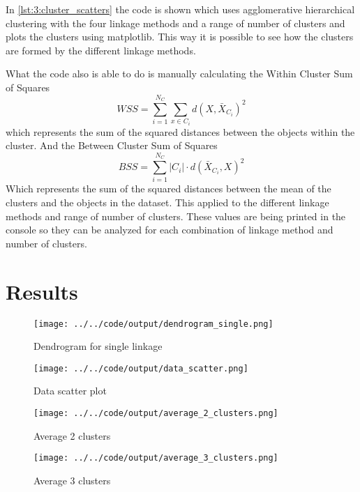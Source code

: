 \documentclass[twoside, a4paper, fleqn, reqno]{article}
\begin{document}
In \autoref{lst:3:cluster_scatters} the code is shown which uses agglomerative hierarchical clustering
with the four linkage methods and a range of number of clusters and plots the clusters using matplotlib.
This way it is possible to see how the clusters are formed by the different linkage methods.
\par
What the code also is able to do is manually calculating the Within Cluster Sum of Squares
\begin{equation*}
	WSS= \sum_{i = 1}^{N_C} \sum_{x \in C_i} d(X, \bar{X}_{C_i} )^2
\end{equation*}
which represents the sum of the squared distances between the objects within the cluster. 
And the Between Cluster Sum of Squares
\begin{equation*}
	BSS= \sum_{i = 1}^{N_C} \left\lvert C_i \right\rvert \cdot d(\bar{X}_{C_i},X)^2
\end{equation*}
Which represents the sum of the squared distances between the mean of the clusters and the objects in the dataset.
This applied to the different linkage methods and range of number of clusters.
These values are being printed in the console so they can be analyzed for each combination
of linkage method and number of clusters.

\section*{Results}


\begin{figure}[h]
	\centering
	\texttt{[image: ../../code/output/dendrogram\_single.png]}
	\caption{Dendrogram for single linkage}
	\label{fig:1:dendrogram_single}
\end{figure}

\begin{figure}
	\centering
	\texttt{[image: ../../code/output/data\_scatter.png]}
	\caption{Data scatter plot}
	\label{fig:2:data_scatter}
\end{figure}

\begin{figure}
	\centering
	\texttt{[image: ../../code/output/average\_2\_clusters.png]}
	\caption{Average 2 clusters}
	\label{fig:2:average_2_clusters}
\end{figure}

\begin{figure}
	\centering
	\texttt{[image: ../../code/output/average\_3\_clusters.png]}
	\caption{Average 3 clusters}
	\label{fig:2:average_3_clusters}
\end{figure}
\end{document}
